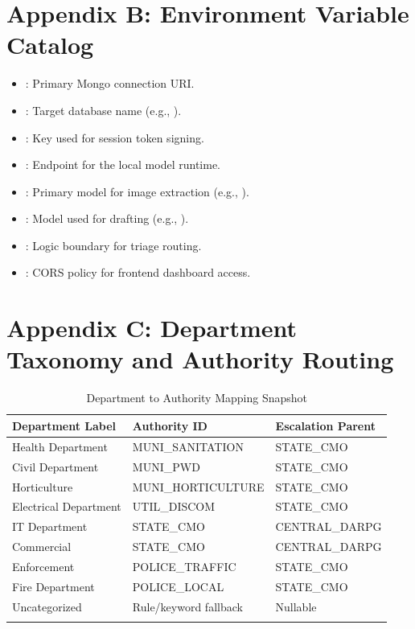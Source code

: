\section{Appendix B: Environment Variable Catalog}

\begin{itemize}[leftmargin=1.5em, noitemsep]
    \item {}: Primary Mongo connection URI.
    \item {}: Target database name (e.g., ).
    \item {}: Key used for session token signing.
    \item {}: Endpoint for the local model runtime.
    \item {}: Primary model for image extraction (e.g., ).
    \item {}: Model used for drafting (e.g., ).
    \item {}: Logic boundary for triage routing.
    \item {}: CORS policy for frontend dashboard access.
\end{itemize}
\normalsize

\section{Appendix C: Department Taxonomy and Authority Routing}

\begin{xltabular}{\textwidth}{|>{\RaggedRight\arraybackslash}p{0.32\textwidth}|>{\RaggedRight\arraybackslash}p{0.26\textwidth}|>{\RaggedRight\arraybackslash}X|}
\hline
\textbf{Department Label} & \textbf{Authority ID} & \textbf{Escalation Parent} \\ \hline
\endhead
Health Department & MUNI\_SANITATION & STATE\_CMO \\ \hline
Civil Department & MUNI\_PWD & STATE\_CMO \\ \hline
Horticulture & MUNI\_HORTICULTURE & STATE\_CMO \\ \hline
Electrical Department & UTIL\_DISCOM & STATE\_CMO \\ \hline
IT Department & STATE\_CMO & CENTRAL\_DARPG \\ \hline
Commercial & STATE\_CMO & CENTRAL\_DARPG \\ \hline
Enforcement & POLICE\_TRAFFIC & STATE\_CMO \\ \hline
Fire Department & POLICE\_LOCAL & STATE\_CMO \\ \hline
Uncategorized & Rule/keyword fallback & Nullable \\ \hline
\caption{Department to Authority Mapping Snapshot}
\end{xltabular}

